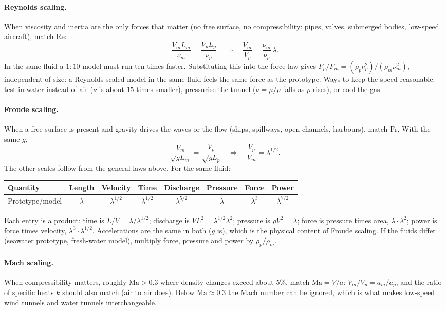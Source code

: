 \paragraph{Reynolds scaling.} When viscosity and inertia are the only forces that matter (no free surface, no compressibility: pipes, valves, submerged bodies, low-speed aircraft), match $\mathrm{Re}$:
\[
\frac{V_mL_m}{\nu_m} = \frac{V_pL_p}{\nu_p} \quad\Longrightarrow\quad \frac{V_m}{V_p} = \frac{\nu_m}{\nu_p}\,\lambda .
\]
In the same fluid a $1{:}10$ model must run ten times faster. Substituting this into the force law gives $F_p/F_m = (\rho_p\nu_p^2)/(\rho_m\nu_m^2)$, independent of size: a Reynolds-scaled model in the same fluid feels the same force as the prototype. Ways to keep the speed reasonable: test in water instead of air ($\nu$ is about $15$ times smaller), pressurise the tunnel ($\nu = \mu/\rho$ falls as $\rho$ rises), or cool the gas.

\paragraph{Froude scaling.} When a free surface is present and gravity drives the waves or the flow (ships, spillways, open channels, harbours), match $\mathrm{Fr}$. With the same $g$,
\[
\frac{V_m}{\sqrt{gL_m}} = \frac{V_p}{\sqrt{gL_p}} \quad\Longrightarrow\quad \frac{V_p}{V_m} = \lambda^{1/2}.
\]
The other scales follow from the general laws above. For the same fluid:
\begin{center}\small
\begin{tabular}{lccccccc}
\toprule
Quantity & Length & Velocity & Time & Discharge & Pressure & Force & Power \\
\midrule
Prototype/model & $\lambda$ & $\lambda^{1/2}$ & $\lambda^{1/2}$ & $\lambda^{5/2}$ & $\lambda$ & $\lambda^{3}$ & $\lambda^{7/2}$ \\
\bottomrule
\end{tabular}
\end{center}
Each entry is a product: time is $L/V = \lambda/\lambda^{1/2}$; discharge is $VL^2 = \lambda^{1/2}\lambda^2$; pressure is $\rho V^2 = \lambda$; force is pressure times area, $\lambda \cdot \lambda^2$; power is force times velocity, $\lambda^3 \cdot \lambda^{1/2}$. Accelerations are the same in both ($g$ is), which is the physical content of Froude scaling. If the fluids differ (seawater prototype, fresh-water model), multiply force, pressure and power by $\rho_p/\rho_m$.

\paragraph{Mach scaling.} When compressibility matters, roughly $\mathrm{Ma} > 0.3$ where density changes exceed about $5\%$, match $\mathrm{Ma} = V/a$: $V_m/V_p = a_m/a_p$, and the ratio of specific heats $k$ should also match (air to air does). Below $\mathrm{Ma} \approx 0.3$ the Mach number can be ignored, which is what makes low-speed wind tunnels and water tunnels interchangeable.

